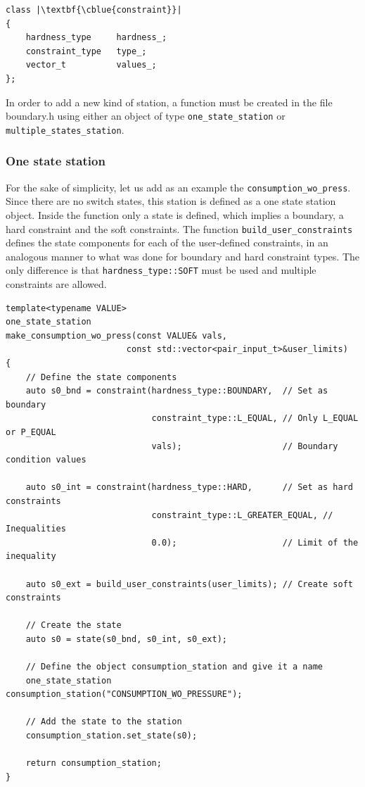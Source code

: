 \begin{verbatim}
class |\textbf{\cblue{constraint}}|
{
    hardness_type     hardness_;
    constraint_type   type_;
    vector_t          values_;
};
\end{verbatim}


In order to add a new kind of station, a function must be created in the file boundary.h using either an object of type \texttt{one\_state\_station} or \texttt{multiple\_states\_station}. 


\subsubsection{One state station}

For the sake of simplicity, let us add as an example the \texttt{consumption\_wo\_press}.  Since there are no switch states, this station is defined as a one state station object. Inside the function only a state is defined, which implies a boundary, a hard constraint and the soft constraints.
The function \texttt{build\_user\_constraints} defines the state components for each of the user-defined constraints, in an analogous manner to what was done for boundary and hard constraint types. The only difference is that \texttt{hardness\_type::SOFT} must be used and multiple constraints are allowed.
\begin{verbatim}
template<typename VALUE>
one_state_station
make_consumption_wo_press(const VALUE& vals,
                        const std::vector<pair_input_t>&user_limits)
{
    // Define the state components
    auto s0_bnd = constraint(hardness_type::BOUNDARY,  // Set as boundary 
                             constraint_type::L_EQUAL, // Only L_EQUAL or P_EQUAL 
                             vals);                    // Boundary condition values 

    auto s0_int = constraint(hardness_type::HARD,      // Set as hard constraints             
                             constraint_type::L_GREATER_EQUAL, // Inequalities 
                             0.0);                     // Limit of the inequality
    
    auto s0_ext = build_user_constraints(user_limits); // Create soft constraints

    // Create the state
    auto s0 = state(s0_bnd, s0_int, s0_ext);
    
    // Define the object consumption_station and give it a name
    one_state_station    consumption_station("CONSUMPTION_WO_PRESSURE"); 
    
    // Add the state to the station
    consumption_station.set_state(s0);

    return consumption_station;
}
    \end{verbatim}

